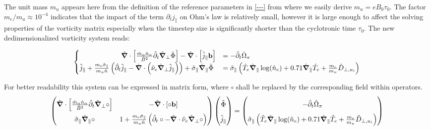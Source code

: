The unit mass $m_u$ appears here from the definition of the reference parameters in \autoref{---} from where we easily derive $m_u = eB_0\tau_0$. The factor $m_e / m_u \approx 10^{-4}$ indicates that the impact of the term $\partial_t j_\parallel$ on Ohm's law is relatively small, however it is large enough to affect the solving properties of the vorticity matrix especially when the timestep size is significantly shorter than the cyclotronic time $\tau_0$. The new dedimensionalized vorticity system reads:


\begin{equation}
	\label{eq:vorticityEquation_ElectronInertia_dedimensionalized}
	\begin{cases}
		\qquad\qquad\qquad \hat{\grad}\cdot\left[\frac{\hat{m}_\alpha \hat{n}_\alpha}{ \hat{B}^2}\hat{\partial}_t\hat{\grad}_\perp\hat{\Phi}\right] - \hat{\grad}\cdot\left[\hat{j}_\parallel \mathbf{b}\right]
		&= -\hat{\partial}_t \hat{\Omega}_\pi \\
		\hat{j}_\parallel + \frac{m_e\hat{\sigma}_\parallel}{m_u\hat{n}}\left(\hat{\partial}_t\hat{j}_\parallel - \hat{\grad}\cdot\left(\hat{\nu}_e\hat{\grad}_\perp \hat{j}_\parallel\right)\right) + \hat{\sigma}_\parallel\hat{\grad}_\parallel\hat{\Phi} &= \hat{\sigma}_\parallel \left(\hat{T}_e\hat{\grad}_\parallel\log(\hat{n}_e) + 0.71\hat{\grad}_\parallel \hat{T}_e + \frac{m_e}{m_u}\hat{D}_{\perp,u_i}\right)
	\end{cases}
\end{equation}

For better readability this system can be expressed in matrix form, where $\circ$ shall be replaced by the corresponding field within operators.
\begin{equation}
	\label{eq:vorticityEquation_ElectronInertia_dedimensionalized_matrix}
	\renewcommand\arraystretch{1.8}
	\begin{pmatrix}
		\hat{\grad}\cdot\left[\frac{\hat{m}_\alpha \hat{n}_\alpha}{ \hat{B}^2}\hat{\partial}_t\hat{\grad}_\perp\circ\right] & 
		- \hat{\grad}\cdot\left[\circ\mathbf{b}\right] \\
		\hat{\sigma}_\parallel\hat{\grad}_\parallel\circ &
		1 + \frac{m_e\hat{\sigma}_\parallel}{m_u\hat{n}}\left(\hat{\partial}_t\circ - \hat{\grad}\cdot\hat{\nu}_e\hat{\grad}_\perp\circ\right)
	\end{pmatrix}
	\begin{pmatrix}
		\hat{\Phi} \\ \hat{j}_\parallel 
	\end{pmatrix} = 
	\begin{pmatrix}
		-\hat{\partial}_t \hat{\Omega}_\pi \\
		\hat{\sigma}_\parallel \left(\hat{T}_e\hat{\grad}_\parallel\log(\hat{n}_e) + 0.71\hat{\grad}_\parallel \hat{T}_e + \frac{m_e}{m_u}\hat{D}_{\perp,u_i}\right)
	\end{pmatrix}
\end{equation}



